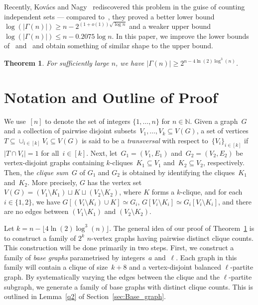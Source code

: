 \documentclass[11pt, final]{article}
\newtheorem{theorem}{Theorem}[section]
\theoremstyle{definition}
\begin{document}
Recently,  Kov\'{a}cs and Nagy~\cite{count_ind_sets} rediscovered this problem in the guise of counting independent sets --- compared to~\cite{erdos_erne_orig},  they proved  a better lower bound~$\log(|\Gamma(n)|) \geq n - 2^{(1+o(1))\sqrt{\log n}}$ and a weaker upper bound $\log(|\Gamma(n)|) \leq n-0.2075\log n$. In this paper, we improve the lower bounds of~\cite{erdos_erne_orig} and~\cite{count_ind_sets} and obtain something of similar shape to the upper bound. 

\begin{theorem}
\label{thm:main}
    For sufficiently large $n$, we have $|\Gamma(n)| \geq 2^{n-4\ln(2)\log^3(n)}$.
\end{theorem}

\section{Notation and Outline of Proof}

We use~$[n]$ to denote the set of integers $\{1, \ldots, n\}$ for $n \in \mathbb{N}$.  Given a graph~$G$ and a collection of pairwise disjoint subsets~$V_1, \dots, V_k \subseteq V(G)$, a set of vertices~$T \subseteq \cup_{i \in [k]} V_i \subseteq V(G)$ is said to be a \emph{transversal} with respect to~$\{V_i\}_{i \in [k]}$ if~$|T \cap V_i| = 1$ for all~$i \in [k]$. Next, let~$G_1 = (V_1, E_1)$ and~$G_2 = (V_2, E_2)$ be vertex-disjoint graphs containing $k$-cliques~$K_1 \subseteq V_1$ and~$K_2 \subseteq V_2$, respectively. Then, the \emph{clique sum}~$G$ of $G_1$ and $G_2$ is obtained by identifying the cliques~$K_1$ and~$K_2$. More precisely, $G$ has the vertex set $V(G) = (V_1\setminus K_1) \sqcup K \sqcup (V_2\setminus K_2)$, where $K$ forms a $k$-clique, and for each~$i \in \{1,2\}$, we have $G[(V_i\setminus K_i) \cup K] \simeq G_i$, $G[V_i\setminus K_i] \simeq G_i[V_i \setminus K_i]$, and there are no edges between $(V_1\setminus K_1)$ and $(V_2\setminus K_2)$. 

Let $k = n - \lfloor 4 \ln(2) \log^3(n)\rfloor$. The general idea of our proof of Theorem~\ref{thm:main} is to construct a family of $2^{k}$ $n$-vertex graphs having pairwise distinct clique counts. This construction will be done primarily in two steps. First, we construct a family of \emph{base graphs} parametrised by integers~$a$ and~$\ell$. Each graph in this family will contain a clique of size~$k+8$ and a vertex-disjoint balanced $\ell$-partite graph. By systematically varying the edges between the clique and the $\ell$-partite subgraph, we generate a family of base graphs with distinct clique counts. This is outlined in Lemma~\ref{q2} of Section~\ref{sec:Base_graph}.
\end{document}
